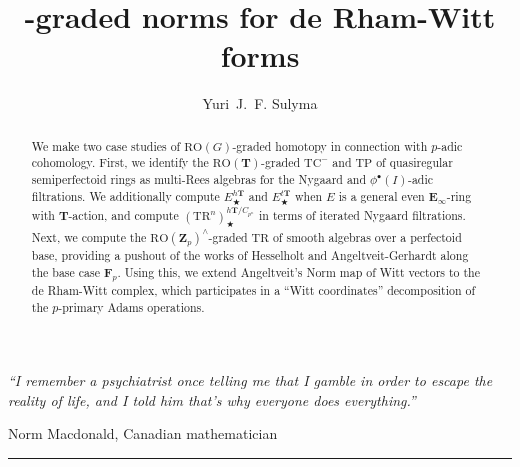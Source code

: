 \documentclass[reqno,10pt]{amsart}
\title{\tops{$\RO(G)$}{RO(G)}-graded norms for de Rham-Witt forms}
\author{Yuri~J.~F. Sulyma}
\begin{document}
\begin{abstract}
  We make two case studies of $\mathrm{RO}(G)$-graded homotopy in connection with $p$-adic cohomology. First, we identify the $\mathrm{RO}(\mathbf T)$-graded $\mathrm{TC}^-$ and $\mathrm{TP}$ of quasiregular semiperfectoid rings as multi-Rees algebras for the Nygaard and $\phi^\bullet(I)$-adic filtrations. We additionally compute $E^{h\mathbf T}_\bigstar$ and $E^{t\mathbf T}_\bigstar$ when $E$ is a general even $\mathbf E_\infty$-ring with $\mathbf T$-action, and compute $(\mathrm{TR}^n)^{h\mathbf T/C_{p^n}}_\bigstar$ in terms of iterated Nygaard filtrations. Next, we compute the $\mathrm{RO}(\mathbf Z_p)^\land$-graded $\mathrm{TR}$ of smooth algebras over a perfectoid base, providing a pushout of the works of Hesselholt and Angeltveit-Gerhardt along the base case $\mathbf F_p$. Using this, we extend Angeltveit's Norm map of Witt vectors to the de Rham-Witt complex, which participates in a ``Witt coordinates'' decomposition of the $p$-primary Adams operations.
\end{abstract}

\maketitle
\tableofcontents


\begin{flushright}
  \begin{minipage}{0.465\textwidth}
    \itshape
    \raggedleft
     ``I remember a psychiatrist once telling me that I gamble in order to escape the reality of life, and I told him that’s why everyone does everything.''

    \medskip
    \normalfont
    Norm Macdonald, Canadian mathematician %
    
    \vspace{0.2cm} %
    \hrule
  \end{minipage}
\end{flushright}









\end{document}
